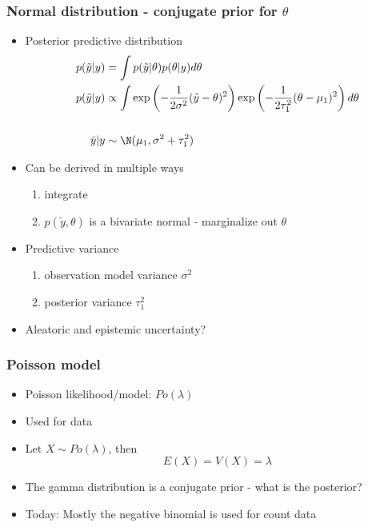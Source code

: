 \documentclass[10pt]{beamer}
\begin{document}
\begin{frame}
  \frametitle{Normal distribution - conjugate prior for $\theta$}
  \begin{itemize}
  \item Posterior predictive distribution
    \begin{align*}
      p(\tilde{y}|y)&=\int p(\tilde{y}|\theta)p(\theta|y) d\theta \\
      p(\tilde{y}|y)& \propto \int
      \exp\left(-\frac{1}{2\sigma^2}(\tilde{y}-\theta)^2\right)\exp\left(-\frac{1}{2\tau_1^2}(\theta-\mu_1)^2\right) d\theta \\
      ~&~\\
      \tilde{y}|y &\sim \N(\mu_1,\sigma^2+\tau_1^2)
    \end{align*}
  \pause
  \item Can be derived in multiple ways
  \begin{enumerate}
    \item integrate
    \item $p(\tilde{y},\theta)$ is a bivariate normal - marginalize out $\theta$
  \end{enumerate}
  \item Predictive variance
  \begin{enumerate}
    \item observation model variance $\sigma^2$
    \item posterior variance $\tau_1^2$
  \end{enumerate}
  \pause
  \item {\color{uured}Aleatoric} and {\color{uured}epistemic} uncertainty?
  \end{itemize}
\end{frame}

\begin{frame}
  \frametitle{Poisson model}
  \begin{itemize}
  \item Poisson likelihood/model: $Po(\lambda)$
  \item Used for  data
  \pause
  \item Let $X \sim Po(\lambda)$, then
  \[
  E(X) = V(X) = \lambda
  \]
  \pause
  \item The gamma distribution is a conjugate prior - what is the posterior?
  \pause
  \item Today: Mostly the negative binomial is used for count data
  \end{itemize}
\end{frame}
\end{document}
